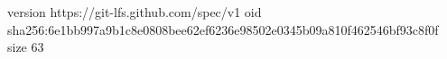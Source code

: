 version https://git-lfs.github.com/spec/v1
oid sha256:6e1bb997a9b1c8e0808bee62ef6236e98502e0345b09a810f462546bf93c8f0f
size 63
